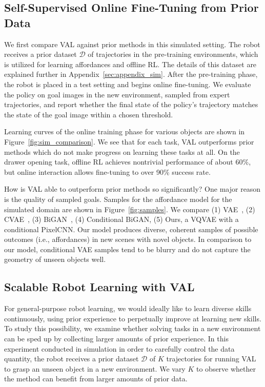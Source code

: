 \documentclass[letterpaper, 10 pt, conference]{ieeeconf}  %
\begin{document}
\subsection{Self-Supervised Online Fine-Tuning from Prior Data}
We first compare VAL against prior methods in this simulated setting.
The robot receives a prior dataset $\mathcal{D}$ of trajectories in the pre-training environments, which is utilized for learning affordances and offline RL. The details of this dataset are explained further in Appendix~\ref{sec:appendix_sim}. After the pre-training phase, the robot is placed in a test setting and begins online fine-tuning. We evaluate the policy on goal images in the new environment, sampled from expert trajectories, and report whether the final state of the policy's trajectory matches the state of the goal image within a chosen threshold.

Learning curves of the online training phase for various objects are shown in Figure~\ref{fig:sim_comparison}.
We see that for each task, VAL outperforms prior methods which do not make progress on learning these tasks at all.
On the drawer opening task, offline RL achieves nontrivial performance of about 60\%, but online interaction allows fine-tuning to over 90\% success rate.

How is VAL able to outperform prior methods so significantly? One major reason is the quality of sampled goals.
Samples for the affordance model for the simulated domain are shown in Figure~\ref{fig:samples}. 
We compare (1) VAE~\cite{kingma2014vae}, (2) CVAE~\cite{sohn2015cvae}, (3) BiGAN~\cite{donahue2017bigan}, (4) Conditional BiGAN, (5) Ours, a VQVAE with a conditional PixelCNN.
Our model produces diverse, coherent samples of possible outcomes (i.e., affordances) in new scenes with novel objects.
In comparison to our model, conditional VAE samples tend to be blurry and do not capture the geometry of unseen objects well.

\subsection{Scalable Robot Learning with VAL}
For general-purpose robot learning, we would ideally like to learn diverse skills continuously, using prior experience to perpetually improve at learning new skills.
To study this possibility, we examine whether solving tasks in a new environment can be sped up by collecting larger amounts of prior experience.
In this experiment conducted in simulation in order to carefully control the data quantity, the robot receives a prior dataset $\mathcal{D}$ of $K$ trajectories for running VAL to grasp an unseen object in a new environment.
We vary $K$ to observe whether the method can benefit from larger amounts of prior data.
\end{document}
